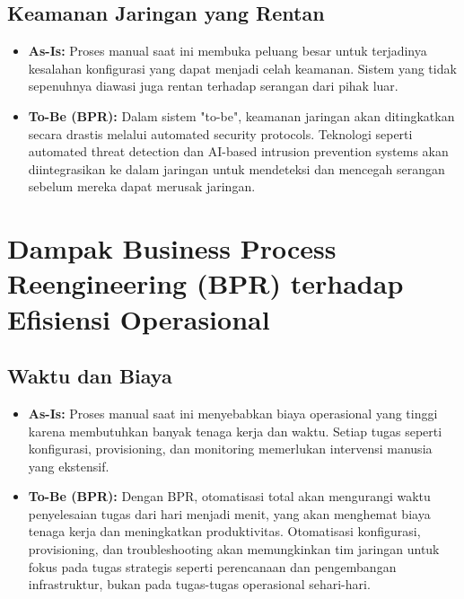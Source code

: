 \subsection{Keamanan Jaringan yang Rentan}
\begin{itemize}
    \item \textbf{As-Is:} Proses manual saat ini membuka peluang besar untuk terjadinya kesalahan konfigurasi yang dapat menjadi celah keamanan. Sistem yang tidak sepenuhnya diawasi juga rentan terhadap serangan dari pihak luar.
    
    \item \textbf{To-Be (BPR):} Dalam sistem "to-be", keamanan jaringan akan ditingkatkan secara drastis melalui automated security protocols. Teknologi seperti automated threat detection dan AI-based intrusion prevention systems akan diintegrasikan ke dalam jaringan untuk mendeteksi dan mencegah serangan sebelum mereka dapat merusak jaringan.
\end{itemize}

\section{Dampak Business Process Reengineering (BPR) terhadap Efisiensi Operasional}

\subsection{Waktu dan Biaya}
\begin{itemize}
    \item \textbf{As-Is:} Proses manual saat ini menyebabkan biaya operasional yang tinggi karena membutuhkan banyak tenaga kerja dan waktu. Setiap tugas seperti konfigurasi, provisioning, dan monitoring memerlukan intervensi manusia yang ekstensif.
    
    \item \textbf{To-Be (BPR):} Dengan BPR, otomatisasi total akan mengurangi waktu penyelesaian tugas dari hari menjadi menit, yang akan menghemat biaya tenaga kerja dan meningkatkan produktivitas. Otomatisasi konfigurasi, provisioning, dan troubleshooting akan memungkinkan tim jaringan untuk fokus pada tugas strategis seperti perencanaan dan pengembangan infrastruktur, bukan pada tugas-tugas operasional sehari-hari.
\end{itemize}

